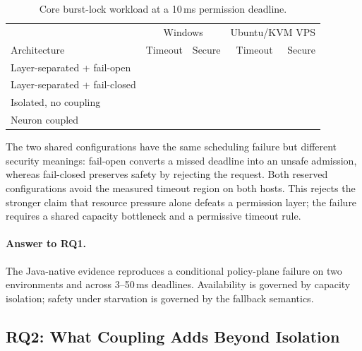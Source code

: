 \begin{table}[t]
\centering
\small
\caption{Core burst-lock workload at a 10\,ms permission deadline.}
\label{tab:ten-ms}
\begin{tabular}{lrrrr}
\toprule
 & \multicolumn{2}{c}{Windows} & \multicolumn{2}{c}{Ubuntu/KVM VPS} \\
Architecture & Timeout & Secure & Timeout & Secure \\
\midrule
Layer-separated + fail-open   & \ComputingwindowslocalFailOpenTimeout{} & \ComputingwindowslocalFailOpenSecure{} & \ComputingvpsubuntukvmFailOpenTimeout{} & \ComputingvpsubuntukvmFailOpenSecure{} \\
Layer-separated + fail-closed & \ComputingwindowslocalFailClosedTimeout{} & \ComputingwindowslocalFailClosedSecure{} & \ComputingvpsubuntukvmFailClosedTimeout{} & \ComputingvpsubuntukvmFailClosedSecure{} \\
Isolated, no coupling         & \ComputingwindowslocalIsolatedTimeout{} & \ComputingwindowslocalIsolatedSecure{} & \ComputingvpsubuntukvmIsolatedTimeout{} & \ComputingvpsubuntukvmIsolatedSecure{} \\
Neuron coupled                & \ComputingwindowslocalCoupledTimeout{} & \ComputingwindowslocalCoupledSecure{} & \ComputingvpsubuntukvmCoupledTimeout{} & \ComputingvpsubuntukvmCoupledSecure{} \\
\bottomrule
\end{tabular}
\end{table}

The two shared configurations have the same scheduling failure but different
security meanings: fail-open converts a missed deadline into an unsafe
admission, whereas fail-closed preserves safety by rejecting the request.
Both reserved configurations avoid the measured timeout region on both
hosts. This rejects the stronger claim that resource pressure alone defeats a
permission layer; the failure requires a shared capacity bottleneck and a
permissive timeout rule.

\paragraph{Answer to RQ1.}
The Java-native evidence reproduces a conditional policy-plane failure on
two environments and across 3--50\,ms deadlines. Availability is governed by
capacity isolation; safety under starvation is governed by the fallback
semantics.

\subsection{RQ2: What Coupling Adds Beyond Isolation}
\label{sec:eval-joint}

